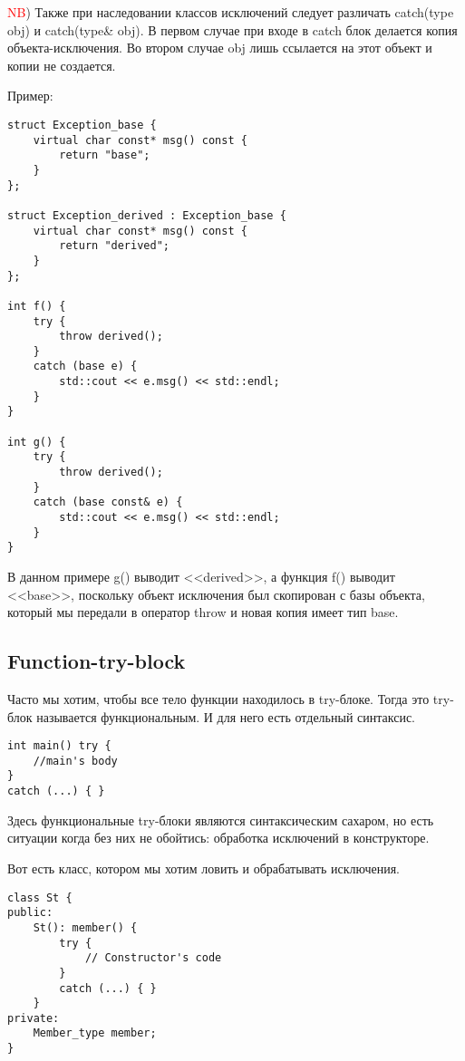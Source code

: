 \textcolor{red}{NB}) Также при наследовании классов исключений следует различать catch(type obj) и catch(type\& obj). В первом случае при входе в catch блок делается копия объекта-исключения. Во втором случае obj лишь ссылается на этот объект и копии не создается.

Пример:
\begin{verbatim}
struct Exception_base {
    virtual char const* msg() const {
        return "base";
    }
};

struct Exception_derived : Exception_base {
    virtual char const* msg() const {
        return "derived";
    }
};

int f() {
    try {
        throw derived();
    }
    catch (base e) {
        std::cout << e.msg() << std::endl;
    }
}

int g() {
    try {
        throw derived();
    }
    catch (base const& e) {
        std::cout << e.msg() << std::endl;
    }
}
\end{verbatim}

В данном примере g() выводит <<derived>>, а функция f() выводит <<base>>, поскольку объект исключения был скопирован с базы объекта, который мы передали в оператор throw и новая копия имеет тип base.

\subsection{Function-try-block}

Часто мы хотим, чтобы все тело функции находилось в try-блоке. Тогда это try-блок называется функциональным. И для него есть отдельный синтаксис.
\begin{verbatim}
int main() try {
    //main's body
}
catch (...) { }
\end{verbatim}

Здесь функциональные try-блоки являются синтаксическим сахаром, но есть ситуации когда без них не обойтись: обработка исключений в конструкторе.

Вот есть класс, котором мы хотим ловить и обрабатывать исключения.
\begin{verbatim}
class St {
public:
    St(): member() {
        try {
            // Constructor's code
        }
        catch (...) { }
    }
private:
    Member_type member;
}
\end{verbatim}

